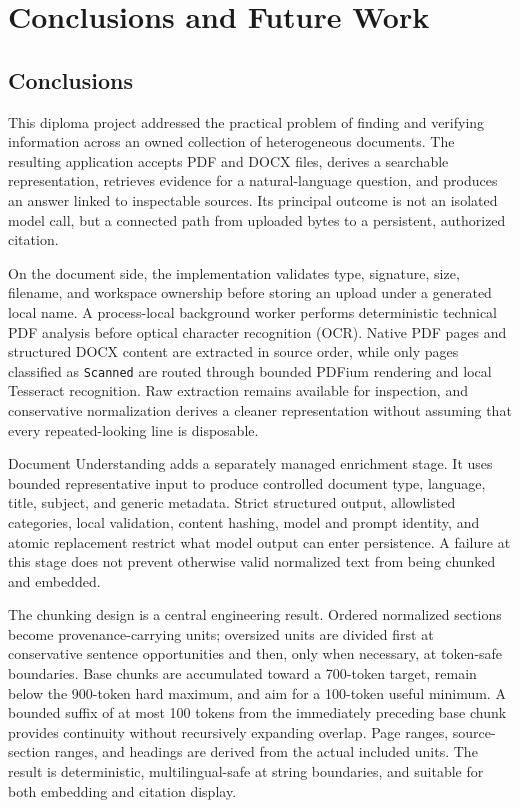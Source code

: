 \chapter{Conclusions and Future Work}
\label{chap:conclusions}

\section{Conclusions}

This diploma project addressed the practical problem of finding and verifying information across an owned collection of heterogeneous documents. The resulting application accepts PDF and DOCX files, derives a searchable representation, retrieves evidence for a natural-language question, and produces an answer linked to inspectable sources. Its principal outcome is not an isolated model call, but a connected path from uploaded bytes to a persistent, authorized citation.

On the document side, the implementation validates type, signature, size, filename, and workspace ownership before storing an upload under a generated local name. A process-local background worker performs deterministic technical PDF analysis before optical character recognition (OCR). Native PDF pages and structured DOCX content are extracted in source order, while only pages classified as \texttt{Scanned} are routed through bounded PDFium rendering and local Tesseract recognition. Raw extraction remains available for inspection, and conservative normalization derives a cleaner representation without assuming that every repeated-looking line is disposable.

Document Understanding adds a separately managed enrichment stage. It uses bounded representative input to produce controlled document type, language, title, subject, and generic metadata. Strict structured output, allowlisted categories, local validation, content hashing, model and prompt identity, and atomic replacement restrict what model output can enter persistence. A failure at this stage does not prevent otherwise valid normalized text from being chunked and embedded.

The chunking design is a central engineering result. Ordered normalized sections become provenance-carrying units; oversized units are divided first at conservative sentence opportunities and then, only when necessary, at token-safe boundaries. Base chunks are accumulated toward a 700-token target, remain below the 900-token hard maximum, and aim for a 100-token useful minimum. A bounded suffix of at most 100 tokens from the immediately preceding base chunk provides continuity without recursively expanding overlap. Page ranges, source-section ranges, and headings are derived from the actual included units. The result is deterministic, multilingual-safe at string boundaries, and suitable for both embedding and citation display.

